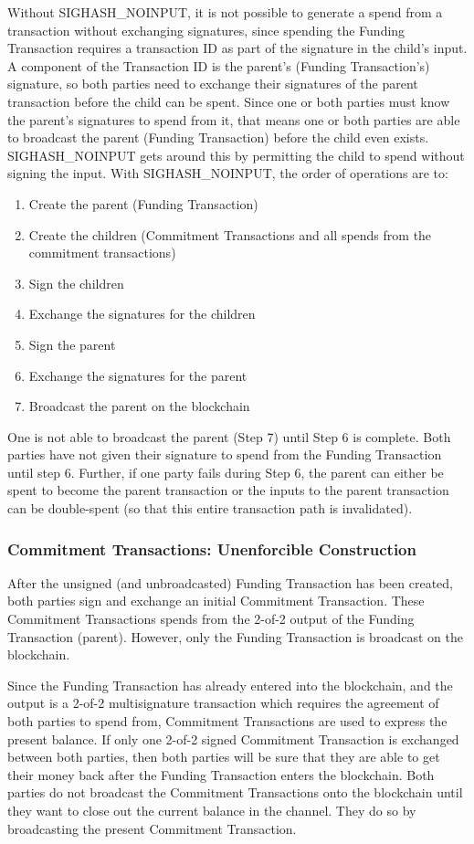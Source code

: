 \documentclass[letterpaper,11pt]{article}
\begin{document}
Without SIGHASH\_NOINPUT, it is not possible to generate a spend from a
transaction without exchanging signatures, since spending the Funding
Transaction requires a transaction ID as part of the signature in the child's
input. A component of the Transaction ID is the parent's (Funding Transaction's)
signature, so both parties need to exchange their signatures of the parent
transaction before the child can be spent. Since one or both parties must know
the parent's signatures to spend from it, that means one or both parties are
able to broadcast the parent (Funding Transaction) before the child even exists.
SIGHASH\_NOINPUT gets around this by permitting the child to spend without
signing the input. With SIGHASH\_NOINPUT, the order of operations are to:
\begin{enumerate}
	\item Create the parent (Funding Transaction)
	\item Create the children (Commitment Transactions and all spends from
		the commitment transactions)
	\item Sign the children 
	\item Exchange the signatures for the children
	\item Sign the parent
	\item Exchange the signatures for the parent
	\item Broadcast the parent on the blockchain
\end{enumerate}

One is not able to broadcast the parent (Step 7) until Step 6 is complete. Both
parties have not given their signature to spend from the Funding Transaction
until step 6. Further, if one party fails during Step 6, the parent can
either be spent to become the parent transaction or the inputs to the parent
transaction can be double-spent (so that this entire transaction path is
invalidated).

\subsubsection{Commitment Transactions: Unenforcible Construction}

After the unsigned (and unbroadcasted) Funding Transaction has been created,
both parties sign and exchange an initial Commitment Transaction. These
Commitment Transactions spends from the 2-of-2 output of the Funding
Transaction (parent). However, only the Funding Transaction is broadcast on the
blockchain.

Since the Funding Transaction has already entered into the blockchain, and the
output is a 2-of-2 multisignature transaction which requires the agreement of
both parties to spend from, Commitment Transactions are used to express the
present balance. If only one 2-of-2 signed Commitment Transaction is exchanged
between both parties, then both parties will be sure that they are able to get
their money back after the Funding Transaction enters the blockchain. Both
parties do not broadcast the Commitment Transactions onto the blockchain until
they want to close out the current balance in the channel. They do so by
broadcasting the present Commitment Transaction.
\end{document}
